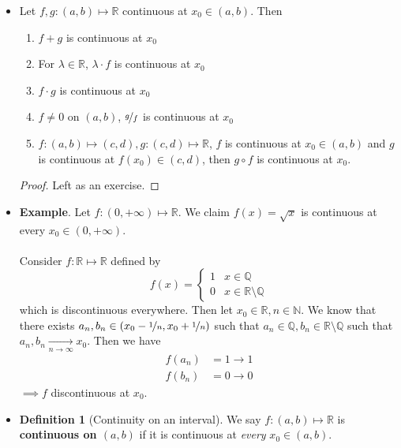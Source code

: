 \documentclass{article}
\newcommand{\Q}{\mathbb{Q}}
\newcommand{\R}{\mathbb{R}}
\newcommand{\N}{\mathbb{N}}
\newcommand{\?}{\stackrel{?}{=}}
\theoremstyle{definition} %
\newtheorem{definition}[subsection]{Definition} %
\begin{document}
\begin{itemize}
    \item[]
    \begin{proposition}
        Let $f, g: (a, b) \mapsto \R$ continuous at $x_0 \in (a, b)$. Then
        \begin{enumerate}[label=(\roman*)]
            \item $f + g$ is continuous at $x_0$
            \item For $\lambda \in \R$, $\lambda \cdot f$ is continuous at $x_0$
            \item $f \cdot g$ is continuous at $x_0$
            \item $f \neq 0$ on $(a, b)$, $\nicefrac{g}{f}$ is continuous at $x_0$
            \item $f: (a, b) \mapsto (c, d), g: (c, d) \mapsto \R$, $f$ is continuous at $x_0 \in (a, b)$ and $g$ is continuous at $f(x_0) \in (c, d)$, then $g \circ f$ is continuous at $x_0$.
        \end{enumerate}
    \end{proposition}
    \begin{proof}
        Left as an exercise.
    \end{proof}
    \item \textbf{Example}. Let $f: (0, +\infty) \mapsto \R$. We claim $f(x) = \sqrt{x}$ is continuous at every $x_0 \in (0, +\infty)$. \\\\
    Consider $f: \R \mapsto \R$ defined by
    \[
    f(x) =
    \begin{cases}
        1 & x \in \Q \\
        0 & x \in \R \setminus \Q
    \end{cases}
    \]
    which is discontinuous everywhere. Then let $x_0 \in \R, n \in \N$. We know that there exists $a_n, b_n \in (x_0 - \nicefrac{1}{n}, x_0 + \nicefrac{1}{n})$ such that $a_n \in \Q, b_n \in \R \setminus \Q$ such that $a_n, b_n \underset{n \rightarrow \infty}{\longrightarrow} x_0$. Then we have
    \begin{align*}
        f(a_n) &= 1 \rightarrow 1 \\
        f(b_n) &= 0 \rightarrow 0
    \end{align*}
    $\implies f$ discontinuous at $x_0$.
    \item[]
    \begin{definition}[Continuity on an interval]
        We say $f: (a, b) \mapsto \R$ is \textbf{continuous on $(a, b)$} if it is continuous at \textit{every} $x_0 \in (a, b)$. \\\\

\end{definition}
\end{itemize}
\end{document}

